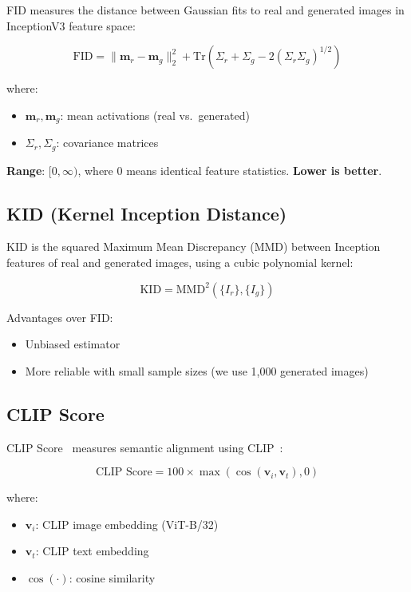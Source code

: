 \documentclass[11pt]{article}
\begin{document}
FID measures the distance between Gaussian fits to real and generated images in InceptionV3 feature space:

\begin{equation}
\text{FID} = \|\mathbf{m}_r - \mathbf{m}_g\|_2^2 + \text{Tr}\left(\Sigma_r + \Sigma_g - 2(\Sigma_r \Sigma_g)^{1/2}\right)
\end{equation}

where:
\begin{itemize}
    \item $\mathbf{m}_r, \mathbf{m}_g$: mean activations (real vs.\ generated)
    \item $\Sigma_r, \Sigma_g$: covariance matrices
\end{itemize}

\textbf{Range}: $[0, \infty)$, where 0 means identical feature statistics.
\textbf{Lower is better}.

\subsection{KID (Kernel Inception Distance)}

KID is the squared Maximum Mean Discrepancy (MMD) between Inception features of real and generated images, using a cubic polynomial kernel:

\begin{equation}
\text{KID} = \text{MMD}^2(\{I_r\}, \{I_g\})
\end{equation}

Advantages over FID:
\begin{itemize}
    \item Unbiased estimator
    \item More reliable with small sample sizes (we use 1,000 generated images)
\end{itemize}

\subsection{CLIP Score}

CLIP Score~\cite{hessel2021clipscore} measures semantic alignment using CLIP~\cite{radford2021learning}:

\begin{equation}
\text{CLIP Score} = 100 \times \max\left(\cos(\mathbf{v}_i, \mathbf{v}_t), 0\right)
\end{equation}

where:
\begin{itemize}
    \item $\mathbf{v}_i$: CLIP image embedding (ViT-B/32)
    \item $\mathbf{v}_t$: CLIP text embedding
    \item $\cos(\cdot)$: cosine similarity
\end{itemize}
\end{document}
